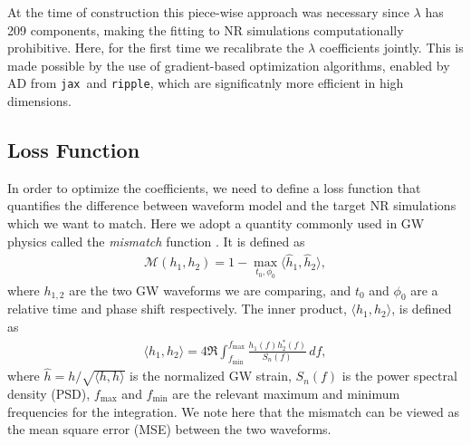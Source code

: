 \documentclass[twocolumn]{aastex631}
\newcommand{\ripple}{\texttt{ripple}}
\newcommand{\jax}{\texttt{jax}}
\begin{document}

At the time of construction this piece-wise approach was necessary since
$\lambda$ has 209 components, making the fitting to NR simulations computationally prohibitive.
Here, for the first time we recalibrate the $\lambda$ coefficients jointly. 
This is made possible by the use of gradient-based optimization algorithms,
enabled by AD from \jax\, and {\ripple}, which are significatnly more efficient in high dimensions.

\subsection{Loss Function} \label{subsec:loss}

In order to optimize the coefficients, we need to define a loss function that
quantifies the difference between waveform model and the target NR simulations which we want to match.
Here we adopt a quantity commonly used in GW physics called the \textit{mismatch} function \citep{husa2016frequency}. 
It is defined as
\begin{align} \label{eq:mismatch}
	\mathcal{M}(h_1, h_2)=1-\max_{t_0, \phi_0}\langle \hat{h}_1, \hat{h}_2\rangle,
\end{align}
where $h_{1,2}$ are the two GW waveforms we are comparing, and $t_0$ and $\phi_0$
are a relative time and phase shift respectively. 
The inner product, $\langle h_1, h_2 \rangle$, is defined as 
\begin{align}\label{eq:inner_prod}
	\langle h_1, h_2 \rangle = 4\Re\int_{f_{\mathrm{min}}}^{f_{\mathrm{max}}}\frac{h_1(f)h_2^{\ast}(f)}{S_n(f)}\,df,
\end{align}
where $\hat{h}=h/\sqrt{\langle h, h \rangle}$ is the normalized GW strain,
$S_n(f)$ is the power spectral density (PSD), $f_{\mathrm{max}}$ and $f_{\mathrm{min}}$ are
the relevant maximum and minimum frequencies for the integration.
We note here that the mismatch can be viewed as the mean square error (MSE) between the
two waveforms.
\end{document}
